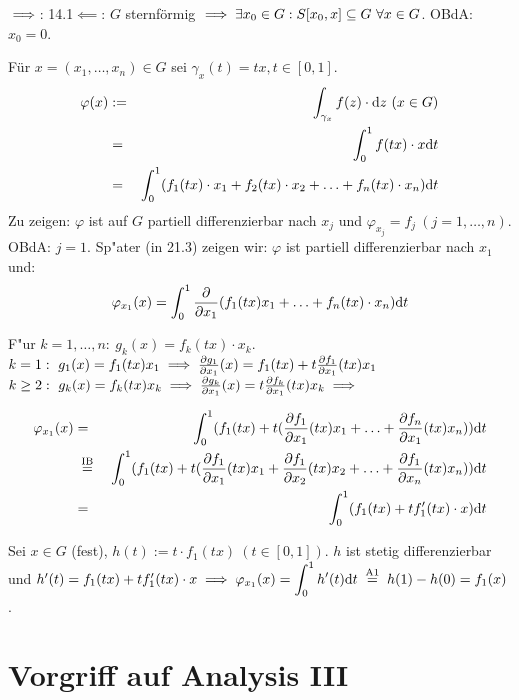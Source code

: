 \documentclass[a4paper,twoside,DIV15,BCOR12mm,chapterprefix=true,headings=twolinechapter]{scrbook}
\begin{document}
\begin{beweis}
\glqq$\implies$\grqq: 14.1\quad \glqq$\impliedby$\grqq: $G$ sternförmig $\implies\exists x_0\in G:S[x_0,x]\subseteq G\ \forall x\in G$. OBdA: $x_0=0$. 

Für $x=(x_1,\ldots,x_n)\in G$ sei $\gamma_x(t)=tx, t\in [0,1]$.
\begin{eqnarray*}
\varphi(x)&:=&\int_{\gamma_x}f(z)\cdot\text{d}z\ (x\in G)\\
&=&\displaystyle\int_0^1 f(tx)\cdot x\text{d}t\\
&=&\displaystyle\int_0^1(f_1(tx)\cdot x_1+f_2(tx)\cdot x_2+\ldots+f_n(tx)\cdot x_n)\text{d}t\\
\end{eqnarray*}
Zu zeigen: $\varphi$ ist auf $G$ partiell differenzierbar nach $x_j$ und $\varphi_{x_j}=f_j\ (j=1,\ldots,n)$.
OBdA: $j=1$. Sp"ater (in 21.3) zeigen wir: $\varphi$ ist partiell differenzierbar nach $x_1$ und:
$$\varphi_{x_1}(x)=\displaystyle\int_0^1\frac{\partial}{\partial x_1}(f_1(tx)x_1+\ldots+f_n(tx)\cdot x_n)\text{d}t$$

F"ur $k=1,\ldots,n:\ g_k(x)=f_k(tx)\cdot x_k$.\\
$k=1:\ g_1(x)=f_1(tx)x_1\implies\frac{\partial g_1}{\partial x_1}(x)=f_1(tx)+t\frac{\partial f_1}{\partial x_1}(tx)x_1$\\
$k\ge 2:\ g_k(x)=f_k(tx)x_k\folgt\frac{\partial g_k}{\partial x_1}(x)=t\frac{\partial f_k}{\partial x_1}(tx)x_k\folgt$

\begin{eqnarray*}
\varphi_{x_1}(x)&=&\int_0^1(f_1(tx)+t(\frac{\partial f_1}{\partial x_1}(tx)x_1+\ldots+\frac{\partial f_n}{\partial x_1}(tx)x_n))\text{d}t\\
&\gleichnach{IB}&\int_0^1(f_1(tx)+t(\frac{\partial f_1}{\partial x_1}(tx)x_1+\frac{\partial f_1}{\partial x_2}(tx)x_2+\ldots+\frac{\partial f_1}{\partial x_n}(tx)x_n))\text{d}t\\
&=&\ds\int_0^1(f_1(tx)+tf_1'(tx)\cdot x)\text{d}t
\end{eqnarray*}

Sei $x\in G$ (fest), $h(t):=t\cdot f_1(tx)\ (t\in [0,1])$. $h$ ist stetig differenzierbar und $h'(t)=f_1(tx)+tf_1'(tx)\cdot x\folgt \varphi_{x_1}(x)=\ds\int_0^1 h'(t)\text{d}t\gleichnach{A1}h(1)-h(0)=f_1(x)$.
\end{beweis}

\chapter{Vorgriff auf Analysis III}
\end{document}
